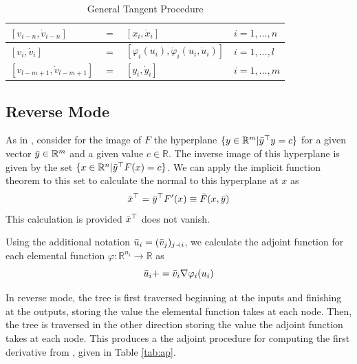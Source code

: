 \documentclass{article}
\begin{document}
\begin{table}[h]
    \centering
    \begin{tabular}{|lcll|}
        \hline
        $[v_{i-n}, \Dot{v}_{i-n}]$ & $=$ & $[x_{i}, \Dot{x}_{i}]$ & $i = 1, \ldots, n$ \\
        \hline
        $[v_{i}, \Dot{v}_{i}]$ & $=$ & $[\varphi_i (u_i), \Dot{\varphi}_i(u_i, \Dot{u}_i)]$ & $i = 1, \ldots, l$ \\
        \hline
        $[v_{l-m+1}, \Dot{v}_{l-m+1}]$ & $=$ & $[y_{i}, \Dot{y}_{i}]$ & $i = 1, \ldots, m$ \\
        \hline
    \end{tabular}
    \caption{General Tangent Procedure}
    \label{tab:gtp}
\end{table}

\subsection{Reverse Mode}

As in \cite{dhamarticle}, consider for the image of $F$ the hyperplane $\{ y \in \mathbb{R}^m | \Bar{y}^\top y = c\}$ for a given vector $\Bar{y} \in \mathbb{R}^m$ and a given value $c \in \mathbb{R}$. The inverse image of this hyperplane is given by the set $\{ x \in \mathbb{R}^n | \Bar{y}^\top F(x) = c\}$. We can apply the implicit function theorem to this set to calculate the normal to this hyperplane at $x$ as
\begin{equation*}
    \Bar{x}^\top = \Bar{y}^\top F'(x) \equiv \Bar{F}(x, \Bar{y})
\end{equation*}
This calculation is provided $\Bar{x}^\top$ does not vanish.

Using the additional notation $\Bar{u}_i = (\Bar{v}_j)_{j \prec i}$, we calculate the adjoint function for each elemental function $\varphi : \mathbb{R}^{n_i} \longrightarrow \mathbb{R}$ as
\begin{equation*}
    \Bar{u}_i += \Bar{v}_i \nabla \varphi_i (u_i)
\end{equation*}

In reverse mode, the tree is first traversed beginning at the inputs and finishing at the outputs, storing the value the elemental function takes at each node. Then, the tree is traversed in the other direction storing the value the adjoint function takes at each node. This produces a the adjoint procedure for computing the first derivative from \cite{dhamarticle}, given in Table \ref{tab:ap}.
\end{document}
